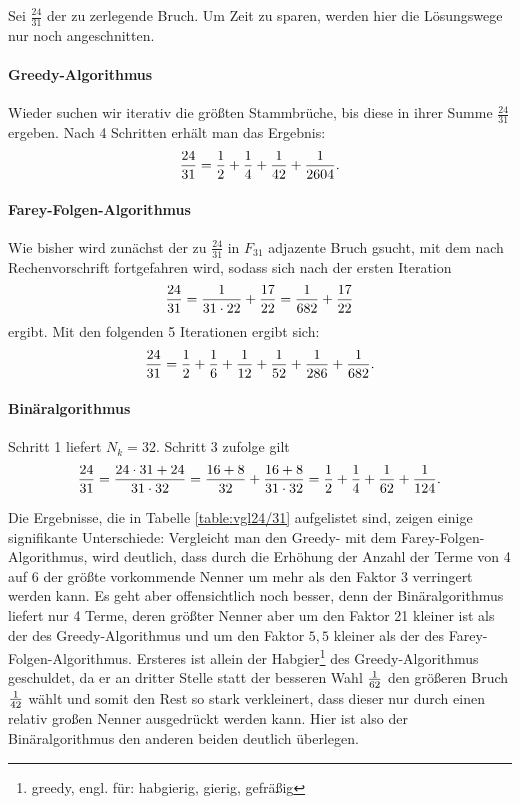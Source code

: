 \vspace{2cm}
\begin{bsp}
	Sei $\frac{24}{31}$ der zu zerlegende Bruch. Um Zeit zu sparen, werden hier die Lösungswege nur noch angeschnitten.
	
	\paragraph{Greedy-Algorithmus} Wieder suchen wir iterativ die größten Stammbrüche, bis diese in ihrer Summe $\frac{24}{31}$ ergeben. Nach 4 Schritten erhält man das Ergebnis:
	$$\frac{24}{31} = \frac{1}{2} + \frac{1}{4} + \frac{1}{42} + \frac{1}{2604}.$$
	
	\paragraph{Farey-Folgen-Algorithmus}Wie bisher wird zunächst der zu $\frac{24}{31}$ in $F_{31}$ adjazente Bruch gsucht, mit dem nach Rechenvorschrift fortgefahren wird, sodass sich nach der ersten Iteration
	$$\frac{24}{31}=\frac{1}{31 \cdot 22}+ \frac{17}{22} = \frac{1}{682} + \frac{17}{22}$$
	ergibt. Mit den folgenden 5 Iterationen ergibt sich:
	$$\frac{24}{31}=\frac{1}{2}+\frac{1}{6}+\frac{1}{12}+\frac{1}{52}+\frac{1}{286}+\frac{1}{682}.$$
	
	\paragraph{Binäralgorithmus}Schritt 1 liefert $N_k = 32$. Schritt 3 zufolge gilt
	$$\frac{24}{31} = \frac{24 \cdot 31 + 24}{31\cdot32} = \frac{16+8}{32} + \frac{16+8}{31 \cdot 32} = \frac{1}{2} + \frac{1}{4} + \frac{1}{62} + \frac{1}{124}.$$
	
	Die Ergebnisse, die in Tabelle \ref{table:vgl24/31} aufgelistet sind, zeigen einige signifikante Unterschiede: Vergleicht man den Greedy- mit dem Farey-Folgen-Algorithmus,  wird deutlich, dass durch die Erhöhung der Anzahl der Terme von 4 auf 6 der größte vorkommende Nenner um mehr als den Faktor 3 verringert werden kann. Es geht aber offensichtlich noch besser, denn der Binäralgorithmus liefert nur 4 Terme, deren größter Nenner aber um den Faktor 21 kleiner ist als der des Greedy-Algorithmus und um den Faktor $5,5$ kleiner als der des Farey-Folgen-Algorithmus. Ersteres ist allein der Habgier\footnote{greedy, engl. für: habgierig, gierig, gefräßig} des Greedy-Algorithmus geschuldet, da er an dritter Stelle statt der besseren Wahl $\frac{1}{62}$ den größeren Bruch $\frac{1}{42}$ wählt und somit den Rest so stark verkleinert, dass dieser nur durch einen relativ großen Nenner ausgedrückt werden kann. Hier ist also der Binäralgorithmus den anderen beiden deutlich überlegen.


\end{bsp}

